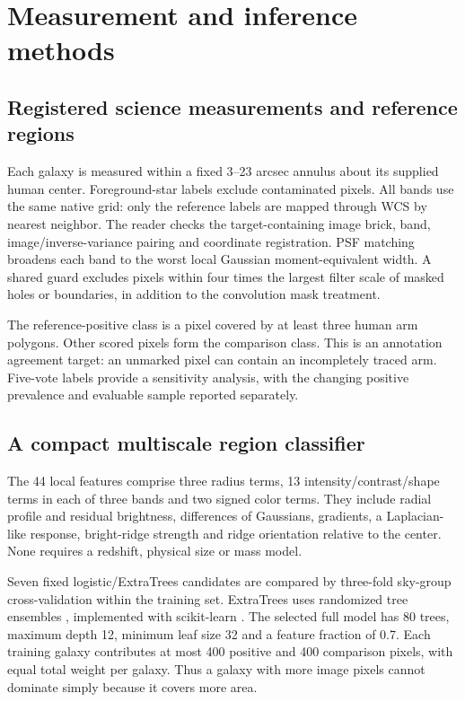 \documentclass[11pt]{article}
\begin{document}
\section{Measurement and inference methods}
\label{sec:methods}
\subsection{Registered science measurements and reference regions}
Each galaxy is measured within a fixed 3--23 arcsec annulus about its supplied
human center. Foreground-star labels exclude contaminated pixels. All bands use
the same native grid: only the reference labels are mapped through WCS by
nearest neighbor. The reader checks the target-containing image brick, band,
image/inverse-variance pairing and coordinate registration. PSF matching broadens
each band to the worst local Gaussian moment-equivalent width. A shared guard
excludes pixels within four times the largest filter scale of masked holes or
boundaries, in addition to the convolution mask treatment.

The reference-positive class is a pixel covered by at least three human arm
polygons. Other scored pixels form the comparison class. This is an annotation
agreement target: an unmarked pixel can contain an incompletely traced arm.
Five-vote labels provide a sensitivity analysis, with the changing positive
prevalence and evaluable sample reported separately.

\subsection{A compact multiscale region classifier}
The 44 local features comprise three radius terms, 13 intensity/contrast/shape
terms in each of three bands and two signed color terms. They include radial
profile and residual brightness, differences of Gaussians, gradients, a
Laplacian-like response, bright-ridge strength and ridge orientation relative
to the center. None requires a redshift, physical size or mass model.

Seven fixed logistic/ExtraTrees candidates are compared by three-fold
sky-group cross-validation within the training set. ExtraTrees uses randomized
tree ensembles \citep{geurts2006}, implemented with scikit-learn
\citep{pedregosa2011}. The selected full model has 80 trees, maximum depth 12,
minimum leaf size 32 and a feature fraction of 0.7. Each training galaxy
contributes at most 400 positive and 400 comparison pixels, with equal total
weight per galaxy. Thus a galaxy with more image pixels cannot dominate simply
because it covers more area.
\end{document}

